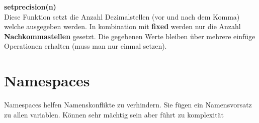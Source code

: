\textbf{setprecision(n)}\\

Diese Funktion setzt die Anzahl Dezimalstellen (vor und nach dem Komma) welche ausgegeben werden. 
In kombination mit \textbf{fixed} werden nur die Anzahl \textbf{Nachkommastellen} gesetzt. 
Die gegebenen Werte bleiben über mehrere einfüge Operationen erhalten (muss man nur einmal setzen). 

\section{Namespaces}

Namespaces helfen Namenskonflikte zu verhindern. 
Sie fügen ein Namensvorsatz zu allen variablen. 
Können sehr mächtig sein aber führt zu komplexität

